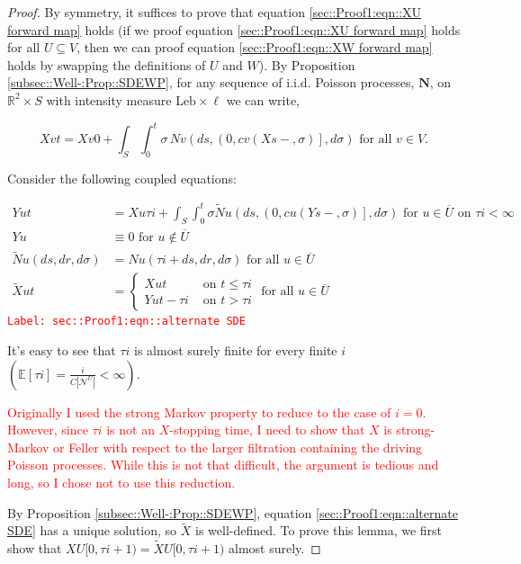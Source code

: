 \documentclass[12pt]{article}
\newcommand{\mb}{\mathbb}
\newcommand{\mc}{\mathcal}
\newcommand{\ov}{\overline}
\newcommand{\te}{\text}
\newcommand{\tr}{\textcolor{red}}
\newcommand{\labe}[1]{\tr{\texttt{Label: #1}}}
\newcommand{\ind}{\hspace{24pt}}
\newcommand{\ex}[1]{\mb{E}\left[#1\right]}			%
\renewcommand{\v}{v}							%
\newcommand{\vv}{u}								%
\renewcommand{\U}{U}							%
\newcommand{\UU}{W}								%
\renewcommand{\S}{S}							%
\newcommand{\s}{\sigma}							%
\renewcommand{\t}{t}							%
\renewcommand{\tt}{s}							%
\newcommand{\X}{X}								%
\newcommand{\IGr}{c}							%
\newcommand{\neigh}{\mc{N}}						%
\newcommand{\vind}[1]{^{#1}}					%
\newcommand{\cl}{\ov}							%
\newcommand{\const}{C}							%
\newcommand{\poisses}{\mathbf{N}}				%
\newcommand{\poiss}{N}							%
\newcommand{\leb}{\te{Leb}}						%
\newcommand{\Sm}{\ell}							%
\renewcommand{\r}{r}							%
\newcommand{\alt}[1]{\widetilde{#1}}			%
\newcommand{\XX}{Y}								%
\newcommand{\rt}{\tau}							%
\begin{document}
\begin{proof}
By symmetry, it suffices to prove that equation \ref{sec::Proof1:eqn::XU forward map} holds (if we proof equation \eqref{sec::Proof1:eqn::XU forward map} holds for all \(\U \subseteq V\), then we can proof equation \eqref{sec::Proof1:eqn::XW forward map} holds by swapping the definitions of \(\U\) and \(\UU\)). By Proposition \ref{subsec::Well-:Prop::SDEWP}, for any sequence of i.i.d. Poisson processes, \(\poisses\), on \(\mb{R}^2\times \S\) with intensity measure \(\leb\times\Sm\) we can write,

\[\X{\v}{\t} = \X{\v}{0} + \int_\S\int_0^\t \s\,\poiss{\v}\left(d\tt,\left(0,\IGr{\v}(\X{}{\tt-},\s)\right],d\s\right)\te{ for all } \v\in V.\]

Consider the following coupled equations:

\begin{align}
\XX{\vv}{\t} &= \X{\vv}{\rt{i}} + \int_\S\int_0^\t \s\alt{\poiss}{\vv}\left(d\tt,\left(0,\IGr{\vv}(\XX{}{\tt-},\s)\right],d\s\right)\te{ for } \vv \in \cl{\U} \te{ on } \rt{i} < \infty \label{sec::Proof1:eqn::alternate SDE}\\
\XX{\vv}{} &\equiv 0\te{ for } \vv\notin \cl{\U}\nonumber\\
\alt{\poiss}{\vv}(d\tt,d\r,d\s) &= \poiss{\vv}(\rt{i} + d\tt,d\r,d\s) \te{ for all }\vv\in \cl{\U}\nonumber\\
\alt{\X}{\vv}{\t} &= \begin{cases}
\X{\vv}{\t} &\te{ on } \t \leq \rt{i}\\
\XX{\vv}{\t - \rt{i}} &\te{ on } \t > \rt{i}
\end{cases} \te{ for all } \vv\in \cl{\U} \nonumber
\end{align}
\labe{sec::Proof1:eqn::alternate SDE}

It's easy to see that \(\rt{i}\) is almost surely finite for every finite \(i\) \(\left(\ex{\rt{i}} = \frac{i}{\const{}|\neigh\vind{\U}|} < \infty\right)\). 

\ind \tr{Originally I used the strong Markov property to reduce to the case of \(i = 0\). However, since \(\rt{i}\) is not an \(\X{}{}\)-stopping time, I need to show that \(\X{}{}\) is strong-Markov or Feller with respect to the larger filtration containing the driving Poisson processes. While this is not that difficult, the argument is tedious and long, so I chose not to use this reduction.}

\ind By Proposition \ref{subsec::Well-:Prop::SDEWP}, equation \eqref{sec::Proof1:eqn::alternate SDE} has a unique solution, so \(\alt{\X}{}{}\) is well-defined. To prove this lemma, we first show that \(\X{\U}{[0,\rt{i+1})} = \alt{\X}{\U}{}{[0,\rt{i+1})}\) almost surely. 


\end{proof}
\end{document}
